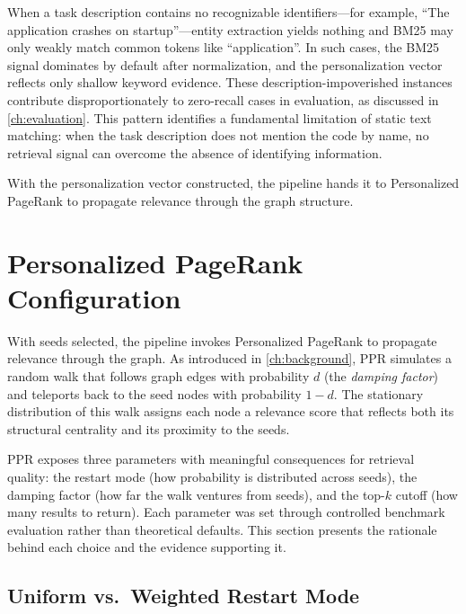When a task description contains no recognizable identifiers---for example, ``The application crashes on startup''---entity extraction yields nothing and BM25 may only weakly match common tokens like ``application''. In such cases, the BM25 signal dominates by default after normalization, and the personalization vector reflects only shallow keyword evidence. These description-impoverished instances contribute disproportionately to zero-recall cases in evaluation, as discussed in \cref{ch:evaluation}. This pattern identifies a fundamental limitation of static text matching: when the task description does not mention the code by name, no retrieval signal can overcome the absence of identifying information.

With the personalization vector constructed, the pipeline hands it to Personalized PageRank to propagate relevance through the graph structure.


\section{Personalized PageRank Configuration}
\label{sec:ppr-config}

With seeds selected, the pipeline invokes Personalized PageRank to propagate relevance through the graph. As introduced in \cref{ch:background}, PPR simulates a random walk that follows graph edges with probability $d$ (the \emph{damping factor}) and teleports back to the seed nodes with probability $1-d$. The stationary distribution of this walk assigns each node a relevance score that reflects both its structural centrality and its proximity to the seeds.

PPR exposes three parameters with meaningful consequences for retrieval quality: the restart mode (how probability is distributed across seeds), the damping factor (how far the walk ventures from seeds), and the top-$k$ cutoff (how many results to return). Each parameter was set through controlled benchmark evaluation rather than theoretical defaults. This section presents the rationale behind each choice and the evidence supporting it.

\subsection{Uniform vs.\ Weighted Restart Mode}
\label{sec:uniform-vs-weighted}


